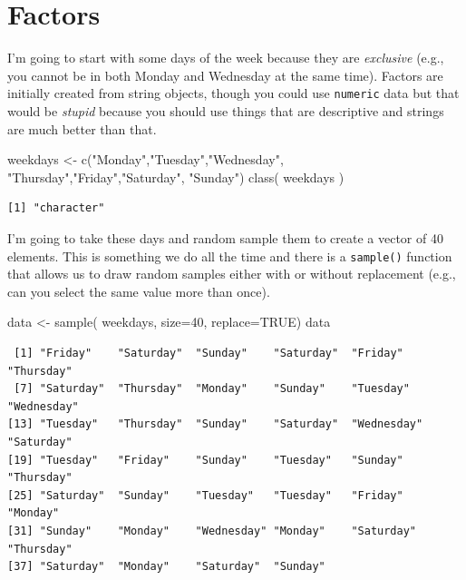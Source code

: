 \documentclass[
  letterpaper,
]{book}
\newenvironment{Shaded}{\begin{snugshade}}{\end{snugshade}}
\newcommand{\AttributeTok}[1]{\textcolor[rgb]{0.40,0.45,0.13}{#1}}
\newcommand{\ConstantTok}[1]{\textcolor[rgb]{0.56,0.35,0.01}{#1}}
\newcommand{\DecValTok}[1]{\textcolor[rgb]{0.68,0.00,0.00}{#1}}
\newcommand{\FunctionTok}[1]{\textcolor[rgb]{0.28,0.35,0.67}{#1}}
\newcommand{\NormalTok}[1]{\textcolor[rgb]{0.00,0.23,0.31}{#1}}
\newcommand{\OtherTok}[1]{\textcolor[rgb]{0.00,0.23,0.31}{#1}}
\newcommand{\StringTok}[1]{\textcolor[rgb]{0.13,0.47,0.30}{#1}}
\begin{document}
\section{Factors}\label{factors}

I'm going to start with some days of the week because they are
\emph{exclusive} (e.g., you cannot be in both Monday and Wednesday at
the same time). Factors are initially created from string objects,
though you could use \texttt{numeric} data but that would be
\emph{stupid} because you should use things that are descriptive and
strings are much better than that.

\begin{Shaded}
\begin{Highlighting}[]
\NormalTok{weekdays }\OtherTok{\textless{}{-}} \FunctionTok{c}\NormalTok{(}\StringTok{"Monday"}\NormalTok{,}\StringTok{"Tuesday"}\NormalTok{,}\StringTok{"Wednesday"}\NormalTok{,}
              \StringTok{"Thursday"}\NormalTok{,}\StringTok{"Friday"}\NormalTok{,}\StringTok{"Saturday"}\NormalTok{, }
              \StringTok{"Sunday"}\NormalTok{)}
\FunctionTok{class}\NormalTok{( weekdays )}
\end{Highlighting}
\end{Shaded}

\begin{verbatim}
[1] "character"
\end{verbatim}

I'm going to take these days and random sample them to create a vector
of 40 elements. This is something we do all the time and there is a
\texttt{sample()} function that allows us to draw random samples either
with or without replacement (e.g., can you select the same value more
than once).

\begin{Shaded}
\begin{Highlighting}[]
\NormalTok{data }\OtherTok{\textless{}{-}} \FunctionTok{sample}\NormalTok{( weekdays, }\AttributeTok{size=}\DecValTok{40}\NormalTok{, }\AttributeTok{replace=}\ConstantTok{TRUE}\NormalTok{)}
\NormalTok{data}
\end{Highlighting}
\end{Shaded}

\begin{verbatim}
 [1] "Friday"    "Saturday"  "Sunday"    "Saturday"  "Friday"    "Thursday" 
 [7] "Saturday"  "Thursday"  "Monday"    "Sunday"    "Tuesday"   "Wednesday"
[13] "Tuesday"   "Thursday"  "Sunday"    "Saturday"  "Wednesday" "Saturday" 
[19] "Tuesday"   "Friday"    "Sunday"    "Tuesday"   "Sunday"    "Thursday" 
[25] "Saturday"  "Sunday"    "Tuesday"   "Tuesday"   "Friday"    "Monday"   
[31] "Sunday"    "Monday"    "Wednesday" "Monday"    "Saturday"  "Thursday" 
[37] "Saturday"  "Monday"    "Saturday"  "Sunday"   
\end{verbatim}
\end{document}
